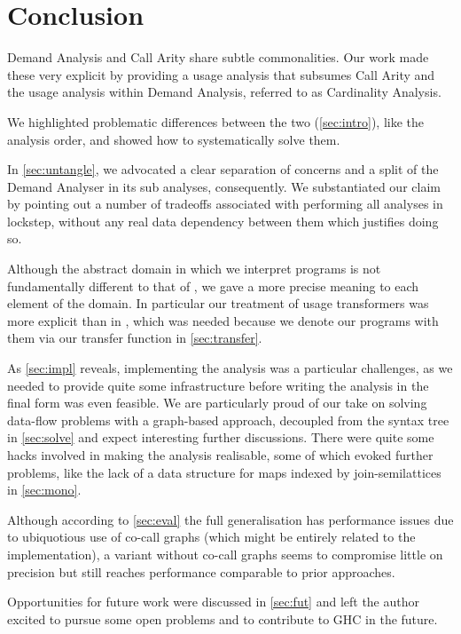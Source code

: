 \chapter{Conclusion}\label{sec:conclusion}

Demand Analysis and Call Arity share subtle commonalities.
Our work made these very explicit by providing a usage analysis that subsumes Call Arity and the usage analysis within Demand Analysis, referred to as Cardinality Analysis.

We highlighted problematic differences between the two (\cref{sec:intro}), like the  \vs {} analysis order, and showed how to systematically solve them.

In \cref{sec:untangle}, we advocated a clear separation of concerns and a split of the Demand Analyser in its sub analyses, consequently.
We substantiated our claim by pointing out a number of tradeoffs associated with performing all analyses in lockstep, without any real data dependency between them which justifies doing so.

Although the abstract domain in which we interpret programs is not fundamentally different to that of \textcite{card}, we gave a more precise meaning to each element of the domain.
In particular our treatment of usage transformers was more explicit than in \textcite{card}, which was needed because we denote our programs with them via our transfer function in \cref{sec:transfer}.

As \cref{sec:impl} reveals, implementing the analysis was a particular challenges, as we needed to provide quite some infrastructure before writing the analysis in the final form was even feasible.
We are particularly proud of our take on solving data-flow problems with a graph-based approach, decoupled from the syntax tree in \cref{sec:solve} and expect interesting further discussions.
There were quite some hacks involved in making the analysis realisable, some of which evoked further problems, like the lack of a data structure for maps indexed by join-semilattices in \cref{sec:mono}.

Although according to \cref{sec:eval} the full generalisation has performance issues due to ubiquotious use of co-call graphs (which might be entirely related to the implementation), a variant without co-call graphs seems to compromise little on precision but still reaches performance comparable to prior approaches.

Opportunities for future work were discussed in \cref{sec:fut} and left the author excited to pursue some open problems and to contribute to GHC in the future.
